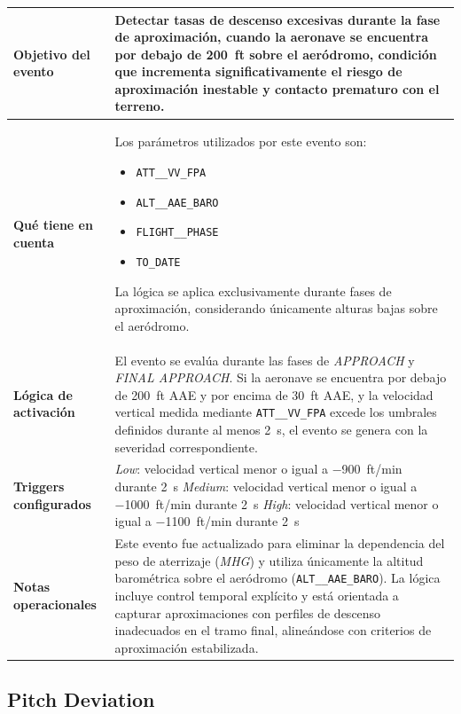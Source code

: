\documentclass[11pt,a4paper]{article}
\begin{document}
	\begin{longtable}{p{5cm} p{9.5cm}}
		\hline
		\textbf{Objetivo del evento} &
		Detectar tasas de descenso excesivas durante la fase de aproximación, cuando la aeronave se encuentra por debajo de \SI{200}{ft} sobre el aeródromo, condición que incrementa significativamente el riesgo de aproximación inestable y contacto prematuro con el terreno. \\
		\hline
		\textbf{Qué tiene en cuenta} &
		Los parámetros utilizados por este evento son:
		\begin{itemize}
			\item \texttt{ATT\_\_VV\_FPA}
			\item \texttt{ALT\_\_AAE\_BARO}
			\item \texttt{FLIGHT\_\_PHASE}
			\item \texttt{TO\_DATE}
		\end{itemize}
		La lógica se aplica exclusivamente durante fases de aproximación, considerando únicamente alturas bajas sobre el aeródromo. \\
		\hline
		\textbf{Lógica de activación} &
		El evento se evalúa durante las fases de \textit{APPROACH} y \textit{FINAL APPROACH}. Si la aeronave se encuentra por debajo de \SI{200}{ft} AAE y por encima de \SI{30}{ft} AAE, y la velocidad vertical medida mediante \texttt{ATT\_\_VV\_FPA} excede los umbrales definidos durante al menos \SI{2}{s}, el evento se genera con la severidad correspondiente. \\
		\hline
		\textbf{Triggers configurados} &
		\textit{Low}: velocidad vertical menor o igual a \SI{-900}{ft/min} durante \SI{2}{s} \newline
		\textit{Medium}: velocidad vertical menor o igual a \SI{-1000}{ft/min} durante \SI{2}{s} \newline
		\textit{High}: velocidad vertical menor o igual a \SI{-1100}{ft/min} durante \SI{2}{s} \\
		\hline
		\textbf{Notas operacionales} &
		Este evento fue actualizado para eliminar la dependencia del peso de aterrizaje (\textit{MHG}) y utiliza únicamente la altitud barométrica sobre el aeródromo (\texttt{ALT\_\_AAE\_BARO}). La lógica incluye control temporal explícito y está orientada a capturar aproximaciones con perfiles de descenso inadecuados en el tramo final, alineándose con criterios de aproximación estabilizada. \\
		\hline
	\end{longtable} \newpage
	
	\subsection{Pitch Deviation}
	
\end{document}
